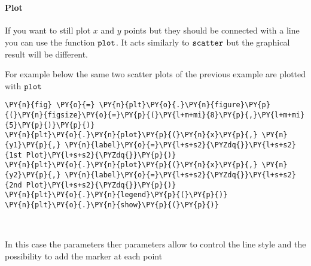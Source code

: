     \begin{center}
    \end{center}
    { \hspace*{\fill} \\}
    
    \hypertarget{plot}{%
\paragraph{Plot}\label{plot}}

If you want to still plot \(x\) and \(y\) points but they should be
connected with a line you can use the function \(\tt{plot}\). It acts
similarly to \(\tt{scatter}\) but the graphical result will be
different.

For example below the same two scatter plots of the previous example are
plotted with \(\tt{plot}\)

    \begin{tcolorbox}[breakable, size=fbox, boxrule=1pt, pad at break*=1mm,colback=cellbackground, colframe=cellborder]
\begin{Verbatim}[commandchars=\\\{\}]
\PY{n}{fig} \PY{o}{=} \PY{n}{plt}\PY{o}{.}\PY{n}{figure}\PY{p}{(}\PY{n}{figsize}\PY{o}{=}\PY{p}{(}\PY{l+m+mi}{8}\PY{p}{,}\PY{l+m+mi}{5}\PY{p}{)}\PY{p}{)}
\PY{n}{plt}\PY{o}{.}\PY{n}{plot}\PY{p}{(}\PY{n}{x}\PY{p}{,} \PY{n}{y1}\PY{p}{,} \PY{n}{label}\PY{o}{=}\PY{l+s+s2}{\PYZdq{}}\PY{l+s+s2}{1st Plot}\PY{l+s+s2}{\PYZdq{}}\PY{p}{)}
\PY{n}{plt}\PY{o}{.}\PY{n}{plot}\PY{p}{(}\PY{n}{x}\PY{p}{,} \PY{n}{y2}\PY{p}{,} \PY{n}{label}\PY{o}{=}\PY{l+s+s2}{\PYZdq{}}\PY{l+s+s2}{2nd Plot}\PY{l+s+s2}{\PYZdq{}}\PY{p}{)}
\PY{n}{plt}\PY{o}{.}\PY{n}{legend}\PY{p}{(}\PY{p}{)}
\PY{n}{plt}\PY{o}{.}\PY{n}{show}\PY{p}{(}\PY{p}{)}
\end{Verbatim}
\end{tcolorbox}

    \begin{center}
    \end{center}
    { \hspace*{\fill} \\}
    
    In this case the parameters ther parameters allow to control the line
style and the possibility to add the marker at each point

